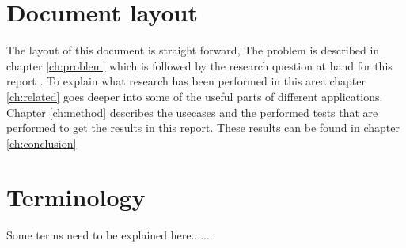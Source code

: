 \section{Document layout}\label{sec:layout}

The layout of this document is straight forward, The problem is described in chapter \ref{ch:problem} which is followed by the research question at hand for this report . To explain what research has been performed in this area chapter \ref{ch:related} goes deeper into some of the useful parts of different applications.
Chapter \ref{ch:method} describes the usecases and the performed tests that are performed to get the results in this report. These results can be found in chapter \ref{ch:conclusion} 
 

\section{Terminology}\label{sec:terminology}
Some terms need to be explained here.......
